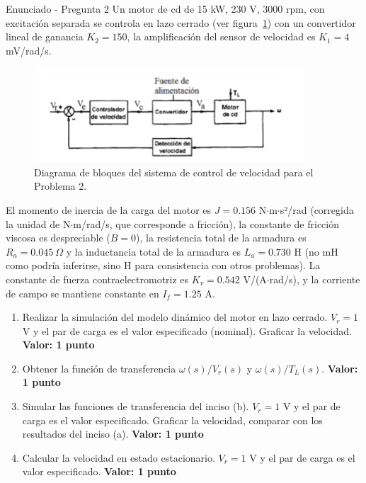 \documentclass[12pt]{article}
\begin{document}
\begin{problemstatementbox}{Enunciado - Pregunta 2}
Un motor de cd de 15 kW, 230 V, 3000 rpm, con excitación separada se controla en lazo cerrado (ver figura~\ref{fig:lazo_cerrado_p2}) con un convertidor lineal de ganancia $K_2 = 150$, la amplificación del sensor de velocidad es $K_1 = 4$ mV/rad/s.

\begin{figure}[H]
    \centering
    \includegraphics[width=0.9\textwidth]{diagrama_de_bloques.png} 
    \caption{Diagrama de bloques del sistema de control de velocidad para el Problema 2.}
    \label{fig:lazo_cerrado_p2}
\end{figure}

El momento de inercia de la carga del motor es $J = 0.156$ N$\cdot$m$\cdot$s²/rad (corregida la unidad de N$\cdot$m/rad/s, que corresponde a fricción), la constante de fricción viscosa es despreciable ($B=0$), la resistencia total de la armadura es $R_a = 0.045\ \Omega$ y la inductancia total de la armadura es $L_a = 0.730$ H (no mH como podría inferirse, sino H para consistencia con otros problemas). La constante de fuerza contraelectromotriz es $K_v = 0.542$ V/(A$\cdot$rad/s), y la corriente de campo se mantiene constante en $I_f = 1.25$ A.

\begin{enumerate}[label=\alph*)]
    \item Realizar la simulación del modelo dinámico del motor en lazo cerrado. $V_r = 1$ V y el par de carga es el valor especificado (nominal). Graficar la velocidad. \textbf{Valor: 1 punto}
    \item Obtener la función de transferencia $\omega(s)/V_r(s)$ y $\omega(s)/T_L(s)$. \textbf{Valor: 1 punto}
    \item Simular las funciones de transferencia del inciso (b). $V_r = 1$ V y el par de carga es el valor especificado. Graficar la velocidad, comparar con los resultados del inciso (a). \textbf{Valor: 1 punto}
    \item Calcular la velocidad en estado estacionario. $V_r = 1$ V y el par de carga es el valor especificado. \textbf{Valor: 1 punto}
\end{enumerate}
\end{problemstatementbox}
\end{document}
